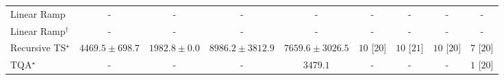 \begin{tabular}{l|cccc|cccc|}
Linear Ramp & {\cellcolor[HTML]{000000}} \color[HTML]{F1F1F1} {\cellcolor{white}} \color{black} - & {\cellcolor[HTML]{000000}} \color[HTML]{F1F1F1} {\cellcolor{white}} \color{black} - & {\cellcolor[HTML]{000000}} \color[HTML]{F1F1F1} {\cellcolor{white}} \color{black} - & {\cellcolor[HTML]{000000}} \color[HTML]{F1F1F1} {\cellcolor{white}} \color{black} - & {\cellcolor[HTML]{000000}} \color[HTML]{F1F1F1} {\cellcolor{white}} \color{black} - & {\cellcolor[HTML]{000000}} \color[HTML]{F1F1F1} {\cellcolor{white}} \color{black} - & {\cellcolor[HTML]{000000}} \color[HTML]{F1F1F1} {\cellcolor{white}} \color{black} - & {\cellcolor[HTML]{000000}} \color[HTML]{F1F1F1} {\cellcolor{white}} \color{black} - \\
Linear Ramp$^\dagger$ & {\cellcolor[HTML]{000000}} \color[HTML]{F1F1F1} {\cellcolor{white}} \color{black} - & {\cellcolor[HTML]{000000}} \color[HTML]{F1F1F1} {\cellcolor{white}} \color{black} - & {\cellcolor[HTML]{000000}} \color[HTML]{F1F1F1} {\cellcolor{white}} \color{black} - & {\cellcolor[HTML]{000000}} \color[HTML]{F1F1F1} {\cellcolor{white}} \color{black} - & {\cellcolor[HTML]{000000}} \color[HTML]{F1F1F1} {\cellcolor{white}} \color{black} - & {\cellcolor[HTML]{000000}} \color[HTML]{F1F1F1} {\cellcolor{white}} \color{black} - & {\cellcolor[HTML]{000000}} \color[HTML]{F1F1F1} {\cellcolor{white}} \color{black} - & {\cellcolor[HTML]{000000}} \color[HTML]{F1F1F1} {\cellcolor{white}} \color{black} - \\
Recursive TS$^\star$ & {\cellcolor[HTML]{9AB8D8}} \color[HTML]{000000} $4469.5\pm 698.7$ & {\cellcolor[HTML]{F2ECF5}} \color[HTML]{000000} $1982.8\pm 0.0$ & {\cellcolor[HTML]{023D60}} \color[HTML]{F1F1F1} $8986.2\pm 3812.9$ & {\cellcolor[HTML]{05659F}} \color[HTML]{F1F1F1} $7659.6\pm 3026.5$ & {\cellcolor[HTML]{49006A}} \color[HTML]{F1F1F1} $10$ [$20$] & {\cellcolor[HTML]{49006A}} \color[HTML]{F1F1F1} $10$ [$21$] & {\cellcolor[HTML]{49006A}} \color[HTML]{F1F1F1} $10$ [$20$] & {\cellcolor[HTML]{CD238F}} \color[HTML]{F1F1F1} $7$ [$20$] \\
TQA$^\star$ & {\cellcolor[HTML]{000000}} \color[HTML]{F1F1F1} {\cellcolor{white}} \color{black} - & {\cellcolor[HTML]{000000}} \color[HTML]{F1F1F1} {\cellcolor{white}} \color{black} - & {\cellcolor[HTML]{000000}} \color[HTML]{F1F1F1} {\cellcolor{white}} \color{black} - & {\cellcolor[HTML]{C6CCE3}} \color[HTML]{000000} $3479.1$ & {\cellcolor[HTML]{000000}} \color[HTML]{F1F1F1} {\cellcolor{white}} \color{black} - & {\cellcolor[HTML]{000000}} \color[HTML]{F1F1F1} {\cellcolor{white}} \color{black} - & {\cellcolor[HTML]{000000}} \color[HTML]{F1F1F1} {\cellcolor{white}} \color{black} - & {\cellcolor[HTML]{FFF7F3}} \color[HTML]{000000} $1$ [$20$] \\

\end{tabular}
